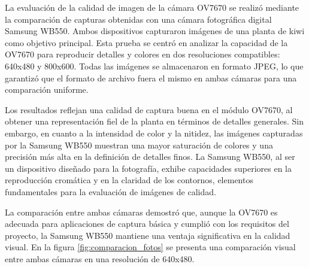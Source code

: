 La evaluación de la calidad de imagen de la cámara OV7670 se realizó mediante la comparación de capturas obtenidas con una cámara fotográfica digital Samsung WB550. Ambos dispositivos capturaron imágenes de una planta de kiwi como objetivo principal. Esta prueba se centró en analizar la capacidad de la OV7670 para reproducir detalles y colores en dos resoluciones compatibles: 640x480 y 800x600. Todas las imágenes se almacenaron en formato JPEG, lo que garantizó que el formato de archivo fuera el mismo en ambas cámaras para una comparación uniforme.

Los resultados reflejan una calidad de captura buena en el módulo OV7670, al obtener una representación fiel de la planta en términos de detalles generales. Sin embargo, en cuanto a la intensidad de color y la nitidez, las imágenes capturadas por la Samsung WB550 muestran una mayor saturación de colores y una precisión más alta en la definición de detalles finos. La Samsung WB550, al ser un dispositivo diseñado para la fotografía, exhibe capacidades superiores en la reproducción cromática y en la claridad de los contornos, elementos fundamentales para la evaluación de imágenes de calidad.

La comparación entre ambas cámaras demostró que, aunque la OV7670 es adecuada para aplicaciones de captura básica y cumplió con los requisitos del proyecto, la Samsung WB550 mantiene una ventaja significativa en la calidad visual. En la figura \ref{fig:comparacion_fotos} se presenta una comparación visual entre ambas cámaras en una resolución de 640x480.

\newpage


